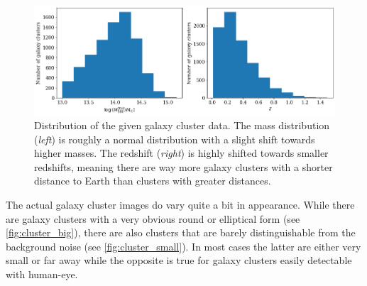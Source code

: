 \begin{figure}[H]
\centering
\includegraphics[width=\textwidth]{images/Chapter3/distr_data.png}
\caption{Distribution of the given galaxy cluster data. The mass distribution (\textit{left}) is roughly a normal distribution with a slight shift towards higher masses. The redshift (\textit{right}) is highly shifted towards smaller redshifts, meaning there are way more galaxy clusters with a shorter distance to Earth than clusters with greater distances.} 
\label{fig:data_dist}
\end{figure}

The actual galaxy cluster images do vary quite a bit in appearance. While there are galaxy clusters with a very obvious round or elliptical form (see \autoref{fig:cluster_big}), there are also clusters that are barely distinguishable from the background noise (see \autoref{fig:cluster_small}). In most cases the latter are either very small or far away while the opposite is true for galaxy clusters easily detectable with human-eye.

